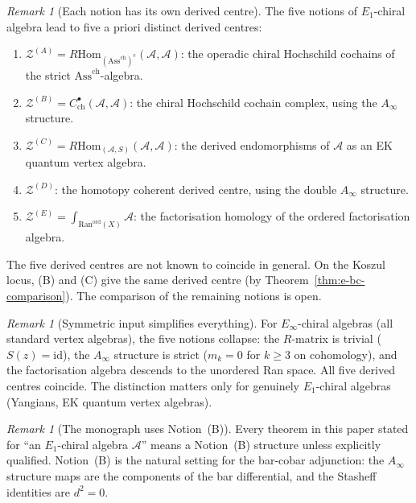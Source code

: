 \documentclass[11pt,reqno]{amsart}
\theoremstyle{definition}
\theoremstyle{remark}
\newtheorem{remark}[theorem]{Remark}
\providecommand{\cA}{\mathcal{A}}
\providecommand{\cZ}{\mathcal{Z}}
\providecommand{\Ran}{\mathrm{Ran}}
\providecommand{\Ainf}{A_\infty}
\providecommand{\Eone}{E_1}
\providecommand{\Einf}{E_\infty}
\providecommand{\id}{\mathrm{id}}
\providecommand{\RHom}{R\!\mathrm{Hom}}
\providecommand{\chirAss}{\mathrm{Ass}^{\mathrm{ch}}}
\begin{document}
\begin{remark}[Each notion has its own derived centre]
\label{warn:e-five-derived-centres}
The five notions of $\Eone$-chiral algebra lead to five
a priori distinct derived centres:
\begin{enumerate}[label=\textup{(\Alph*)}]
\item $\cZ^{(A)} = \RHom_{(\chirAss)^{e}}(\cA, \cA)$:
 the operadic chiral Hochschild cochains of the strict
 $\chirAss$-algebra.
\item $\cZ^{(B)} = C^\bullet_{\mathrm{ch}}(\cA, \cA)$:
 the chiral Hochschild cochain complex, using the $\Ainf$
 structure.
\item $\cZ^{(C)} = \RHom_{(\cA,S)}(\cA, \cA)$:
 the derived endomorphisms of $\cA$ as an EK quantum vertex
 algebra.
\item $\cZ^{(D)}$: the homotopy coherent derived centre,
 using the double $\Ainf$ structure.
\item $\cZ^{(E)} = \int_{\Ran^{\mathrm{ord}}(X)} \cA$:
 the factorisation homology of the ordered factorisation
 algebra.
\end{enumerate}
The five derived centres are not known to coincide in general.
On the Koszul locus, \textup{(B)} and \textup{(C)} give the
same derived centre \textup{(}by
Theorem~\ref{thm:e-bc-comparison}\textup{)}. The comparison
of the remaining notions is open.
\end{remark}

\begin{remark}[Symmetric input simplifies everything]
\label{rem:e-symmetric-simplifies}
For $\Einf$-chiral algebras (all standard vertex algebras),
the five notions collapse: the $R$-matrix is trivial
($S(z) = \id$), the $\Ainf$ structure is strict ($m_k = 0$
for $k \ge 3$ on cohomology), and the factorisation algebra
descends to the unordered Ran space. All five derived centres
coincide. The distinction matters only for genuinely
$\Eone$-chiral algebras (Yangians, EK quantum vertex algebras).
\end{remark}

\begin{remark}[The monograph uses Notion~(B)]
\label{rem:e-monograph-notion-b}
Every theorem in this paper stated for ``an $\Eone$-chiral
algebra $\cA$'' means a Notion~(B) structure unless explicitly
qualified. Notion~(B) is the natural setting for the bar-cobar
adjunction: the $\Ainf$ structure maps are the components of
the bar differential, and the Stasheff identities are $d^2 = 0$.
\end{remark}
\end{document}

